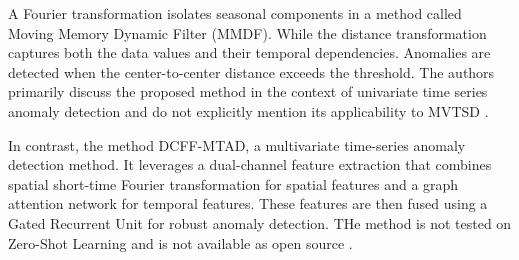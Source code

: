 A Fourier transformation isolates seasonal components in a method called Moving Memory Dynamic Filter (MMDF). While the distance transformation captures both the data values and their temporal dependencies. Anomalies are detected when the center-to-center distance exceeds the threshold. The authors primarily discuss the proposed method in the context of univariate time series anomaly detection and do not explicitly mention its applicability to MVTSD \cite{duan_unsupervised_2021}.

In contrast, the method DCFF-MTAD, a multivariate time-series anomaly detection method. It leverages a dual-channel feature extraction that combines spatial short-time Fourier transformation for spatial features and a graph attention network for temporal features. These features are then fused using a Gated Recurrent Unit for robust anomaly detection. THe method is not tested on Zero-Shot Learning and is not available as open source \cite{xu_dcff-mtad_2023}.
